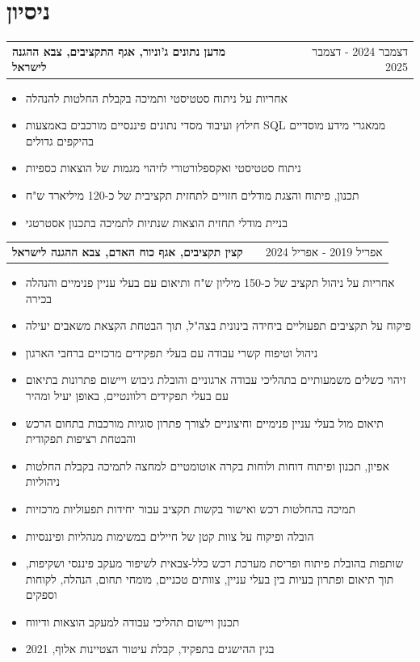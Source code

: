 \documentclass[a4paper,12pt]{article}
\makeatletter
\newenvironment{joblong}[2]
    {
    \begin{tabularx}{\linewidth}{@{}l X r@{}}
    \textbf{#1} & \hfill &  #2 \\[3.75pt]
    \end{tabularx}
    \begin{minipage}[t]{\linewidth}
    \begin{itemize}[nosep,after=\strut, leftmargin=1em, itemsep=3pt,label=-]
    }
    {
    \end{itemize}
    \end{minipage}    
    }
\makeatother
\begin{document}
\section{ניסיון}

\begin{joblong}{מדען נתונים ג'וניור, אגף התקציבים, צבא ההגנה לישראל}{דצמבר 2024 - דצמבר 2025}
    \item אחריות על ניתוח סטטיסטי ותמיכה בקבלת החלטות להנהלה
    \item חילוץ ועיבוד מסדי נתונים פיננסיים מורכבים באמצעות \textenglish{SQL} ממאגרי מידע מוסדיים בהיקפים גדולים
    \item ניתוח סטטיסטי ואקספלורטורי לזיהוי מגמות של הוצאות כספיות
    \item תכנון, פיתוח והצגת מודלים חזויים לתחזית תקציבית של כ-120 מיליארד ש"ח
    \item בניית מודלי תחזית הוצאות שנתיות לתמיכה בתכנון אסטרטגי
\end{joblong}

\begin{joblong}{קצין תקציבים, אגף כוח האדם, צבא ההגנה לישראל}{אפריל 2019 - אפריל 2024}
    \item אחריות על ניהול תקציב של כ-150 מיליון ש"ח ותיאום עם בעלי עניין פנימיים והנהלה בכירה
    \item פיקוח על תקציבים תפעוליים ביחידה בינונית בצה"ל, תוך הבטחת הקצאת משאבים יעילה
    \item ניהול וטיפוח קשרי עבודה עם בעלי תפקידים מרכזיים ברחבי הארגון
    \item זיהוי כשלים משמעותיים בתהליכי עבודה ארגוניים והובלת גיבוש ויישום פתרונות בתיאום עם בעלי תפקידים רלוונטיים, באופן יעיל ומהיר
    \item תיאום מול בעלי עניין פנימיים וחיצוניים לצורך פתרון סוגיות מורכבות בתחום הרכש והבטחת רציפות תפקודית
    \item אפיון, תכנון ופיתוח דוחות ולוחות בקרה אוטומטיים למחצה לתמיכה בקבלת החלטות ניהוליות
    \item תמיכה בהחלטות רכש ואישור בקשות תקציב עבור יחידות תפעוליות מרכזיות
    \item הובלה ופיקוח על צוות קטן של חיילים במשימות מנהליות ופיננסיות
    \item שותפות בהובלת פיתוח ופריסת מערכת רכש כלל-צבאית לשיפור מעקב פיננסי ושקיפות, תוך תיאום ופתרון בעיות בין בעלי עניין, צוותים טכניים, מומחי תחום, הנהלה, לקוחות וספקים
    \item תכנון ויישום תהליכי עבודה למעקב הוצאות ודיווח
    \item בגין ההישגים בתפקיד, קבלת עיטור הצטיינות אלוף, 2021
\end{joblong}
\end{document}
